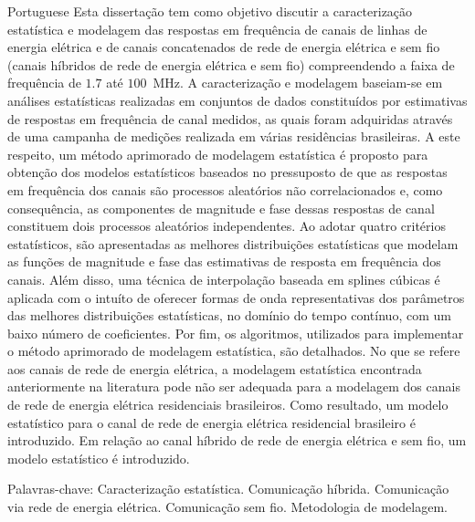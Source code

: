 \setlength{\absparsep}{18pt} 
\begin{resumo}
	\begin{otherlanguage*}{Portuguese}	
Esta disserta\c{c}\~ao tem como objetivo discutir a caracteriza\c{c}\~ao estat\'istica e modelagem das respostas em frequ\^encia de canais de linhas de energia el\'etrica e de canais concatenados de rede de energia el\'etrica e sem fio (canais h\'ibridos de rede de energia el\'etrica e sem fio) compreendendo a faixa de frequ\^encia de $1.7$ at\'e $100$~MHz. A caracteriza\c{c}\~ao e modelagem baseiam-se em an\'alises estat\'isticas realizadas em conjuntos de dados constitu\'idos por estimativas de respostas em frequ\^encia de canal medidos, as quais foram adquiridas atrav\'es de uma campanha de medi\c{c}\~oes realizada em v\'arias resid\^encias brasileiras.  A este respeito, um m\'etodo aprimorado de modelagem estat\'istica \'e proposto para obten\c{c}\~ao dos modelos estat\'isticos baseados no pressuposto de que as respostas em frequ\^encia dos canais s\~ao processos aleat\'orios n\~ao correlacionados e, como consequ\^encia, as componentes de magnitude e fase dessas respostas de canal constituem dois processos aleat\'orios independentes. Ao adotar quatro crit\'erios estat\'isticos, s\~ao apresentadas as melhores distribui\c{c}\~oes estat\'isticas que modelam as fun\c{c}\~oes de magnitude e fase das estimativas de resposta em frequ\^encia dos canais. Al\'em disso, uma t\'ecnica de interpola\c{c}\~ao baseada em splines c\'ubicas \'e aplicada com o intu\'ito de oferecer formas de onda representativas dos par\^ametros das melhores distribui\c{c}\~oes estat\'isticas, no dom\'inio do tempo cont\'inuo, com um baixo n\'umero de coeficientes. Por fim, os algoritmos, utilizados para implementar o m\'etodo aprimorado de modelagem estat\'istica, s\~ao detalhados. No que se refere aos canais de rede de energia el\'etrica, a modelagem estat\'istica encontrada anteriormente na literatura pode n\~ao ser adequada para a modelagem dos canais de rede de energia el\'etrica residenciais brasileiros. Como resultado, um modelo estat\'istico para o canal de rede de energia el\'etrica residencial brasileiro \'e introduzido. Em rela\c{c}\~ao ao canal h\'ibrido de rede de energia el\'etrica e sem fio, um modelo estat\'istico \'e introduzido. 

	Palavras-chave: Caracteriza\c{c}\~ao estat\'istica. Comunica\c{c}\~ao h\'ibrida. Comunica\c{c}\~ao via rede de energia el\'etrica. Comunica\c{c}\~ao sem fio. Metodologia de modelagem.
	
	\end{otherlanguage*}
\end{resumo}




